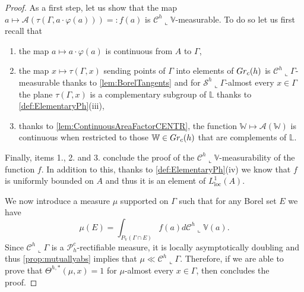 \documentclass[10pt, a4paper,
oneside, headinclude,footinclude]{scrartcl}
\begin{document}
\begin{proof}
As a first step, let us show that the map $a\mapsto \mathcal{A}(\tau(\Gamma,a\cdot\varphi(a)))=:f(a)$ is $\mathcal{C}^h\llcorner \mathbb{V}$-measurable. To do so let us first recall that
\begin{enumerate}
    \item the map $a\mapsto a\cdot\varphi(a)$ is continuous from $A$ to $\Gamma$,
    \item the map $x\mapsto \tau(\Gamma,x)$ sending points of $\Gamma$ into elements of $Gr_c(h)$ is $\mathcal{C}^h\llcorner \Gamma$-measurable thanks to \cref{lem:BorelTangents} and for $\mathcal{S}^h\llcorner \Gamma$-almost every $x\in \Gamma$ the plane $\tau(\Gamma,x)$ is a complementary subgroup of $\mathbb{L}$ thanks to \cref{def:ElementaryPh}(iii),
    \item thanks to \cref{lem:ContinuousAreaFactorCENTR}, the function $\mathbb W\mapsto\mathcal{A}(\mathbb W)$ is continuous when restricted to those $\mathbb{W}\in Gr_c(h)$ that are complements of $\mathbb{L}$.
\end{enumerate}
Finally, items 1., 2. and 3. conclude the proof of the $\mathcal{C}^h\llcorner \mathbb{V}$-measurability of the function $f$.
In addition to this, thanks to \cref{def:ElementaryPh}(iv) we know that $f$ is uniformly bounded on $A$ and thus it is an element of $L^1_{\mathrm{loc}}(A)$.

We now introduce a measure $\mu$ supported on $\Gamma$ such that for any Borel set $E$ we have
$$
\mu(E)=\int_{P_{\mathbb V}(\Gamma\cap E)}f(a)d\mathcal{C}^h\llcorner\mathbb V(a).
$$
Since $\mathcal{C}^h\llcorner \Gamma$ is a $\mathscr{P}^c_h$-rectifiable measure, it is locally asymptotically doubling and thus \cref{prop:mutuallyabs} implies that $\mu\ll \mathcal{C}^h\llcorner\Gamma$. Therefore, if we are able to prove that $\Theta^{h,*}(\mu,x)=1$ for $\mu$-almost every $x\in \Gamma$, then \cite[Theorem 3.1]{FSSC15} concludes the proof.


\end{proof}
\end{document}
